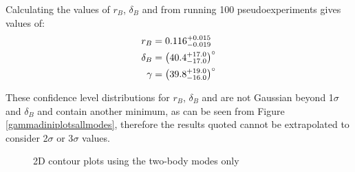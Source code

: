 Calculating the values of $r_B$, $\delta_B$ and \Pgamma from running 100 pseudoexperiments gives values of:
\begin{align*}
r_B &= 0.116^{+0.015}_{-0.019} \\
\delta_B &= \left(40.4^{+17.0}_{-17.0}\right)^{\circ} \\
\gamma &= \left(39.8^{+19.0}_{-16.0}\right)^{\circ} 
\end{align*}

These confidence level distributions for $r_B$, $\delta_B$ and \Pgamma are not Gaussian beyond 1$\sigma$ and $\delta_B$ and \Pgamma contain another minimum, as can be seen from Figure \ref{gammadiniplotsallmodes}, therefore the results quoted cannot be extrapolated to consider 2$\sigma$ or 3$\sigma$ values. 

\begin{figure}[h]
\centering
{}
\caption{2D contour plots using the two-body modes only}
\label{gammadiniplots2body}
\end{figure}

